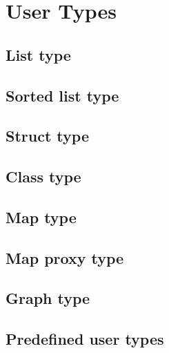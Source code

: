 
\chapter{User Types} \label{userTypes}


\section{List type}


\section{Sorted list type}


\section{Struct type}



\section{Class type}


\section{Map type}


\section{Map proxy type}




\section{Graph type}


\section{Predefined user types}









